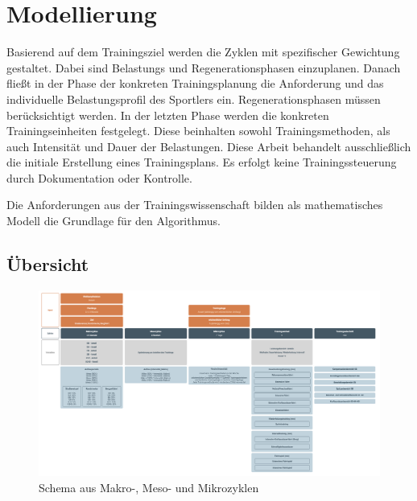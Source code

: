 \chapter{Modellierung}
\label{sec:modellierung}
Basierend auf dem Trainingsziel werden die Zyklen mit spezifischer Gewichtung gestaltet. Dabei sind Belastungs und Regenerationsphasen einzuplanen. Danach fließt in der Phase der konkreten Trainingsplanung die Anforderung und das individuelle Belastungsprofil des Sportlers ein. Regenerationsphasen müssen berücksichtigt werden. 
In der letzten Phase werden die konkreten Trainingseinheiten festgelegt. Diese beinhalten sowohl Trainingsmethoden, als auch Intensität und Dauer der Belastungen. 
Diese Arbeit behandelt ausschließlich die initiale Erstellung eines Trainingsplans. Es erfolgt keine Trainingssteuerung durch Dokumentation oder Kontrolle.

Die Anforderungen aus der Trainingswissenschaft bilden als mathematisches Modell die Grundlage für den Algorithmus. 

\section{Übersicht}
\label{sec:modellierung:uebersicht}
    \begin{figure}[tbh]
    	\includegraphics[width=\textwidth]{gfx/modellierung.png}
    	\caption{Schema aus Makro-, Meso- und Mikrozyklen}
    	\label{fig:modellierung:schema}
    \end{figure}
    
